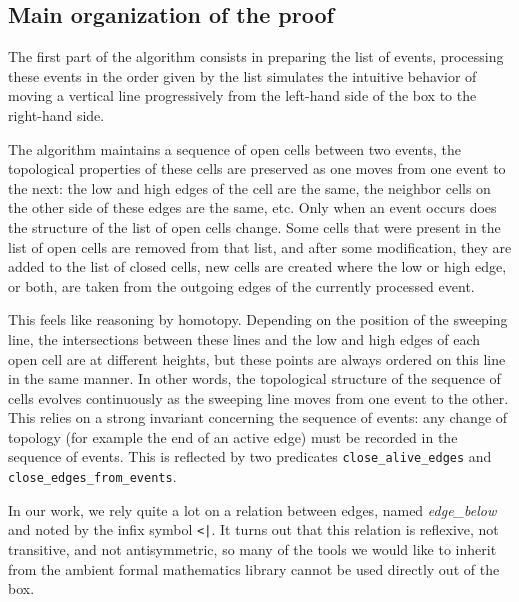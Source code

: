 \documentclass[a4paper, USenglish, cleveref, autoref, thm-restate]{lipics-v2021}
\begin{document}
\subsection{Main organization of the proof}
The first part of the algorithm consists in preparing the list of
events, processing these events in the order given by the list
simulates the intuitive behavior of moving a vertical line
progressively from the left-hand side of the box to the right-hand
side.

The algorithm maintains a sequence of open cells between two events,
the topological properties of these cells are preserved as one moves
from one event to the next: the low and high edges of the cell are the
same, the neighbor cells on the other side of these edges are the
same, etc.  Only when an event occurs does the structure of the list
of open cells change.  Some cells that were present in the list of
open cells are removed from that list, and after some modification,
they are added to the list of closed cells, new cells are created
where the low or high edge, or both, are taken from the outgoing edges
of the currently processed event.

This feels like reasoning by homotopy.  Depending on the position of
the sweeping line, the intersections between these lines and the low
and high edges of each open cell are at different heights, but these
points are always ordered on this line in the same manner.  In other
words, the topological structure of the sequence of cells evolves
continuously as the sweeping line moves from one event to the other.
This relies on a strong invariant concerning the sequence of events:
any change of topology (for example the end of an active edge) must be
recorded in the sequence of events.  This is reflected by two
predicates {\tt close\_alive\_edges} and {\tt close\_edges\_from\_events}.

In our work, we rely quite a lot on a relation between edges, named
{\em edge\_below} and noted by the infix symbol {\tt <|}.  It turns
out that this relation is reflexive, not transitive, and not
antisymmetric, so many of the tools we
would like to inherit from the ambient formal mathematics library
cannot be used directly out of the box.
\end{document}
